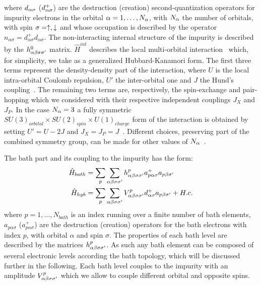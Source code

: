 \documentclass[edipack2.tex]{subfiles}
\begin{document}
where $d_{\alpha\sigma}$ ($d^+_{\alpha\sigma}$) are the destruction (creation)
second-quantization operators for impurity electrons in the
orbital $\alpha=1,\dots,N_\alpha$, with $N_\alpha$ the number of orbitals,
with spin $\sigma=\uparrow,\downarrow$ and whose occupation is described
by the  operator  
$n_{\alpha\sigma}=d^{+}_{\alpha\sigma}d_{\alpha\sigma}$. 
The non-interacting internal structure of the impurity is described by
the $h^{0}_{\alpha\beta\sigma\sigma'}$ matrix. 
$\hat{H}^{int}$ describes the  local multi-orbital
interaction~\cite{Georges2013ACMP} which, for simplicity, we take as a
generalized Hubbard-Kanamori form.  
The first three terms represent the density-density part of the
interaction, where $U$ is the local intra-orbital Coulomb repulsion,
$U'$ the inter-orbital one and $J$ the Hund's coupling~\cite{Georges2013ACMP}.  
The  remaining two terms are, respectively, the spin-exchange and
pair-hopping which we considered with their respective independent
couplings $J_X$ and $J_P$.
In the case $N_\alpha=3$ a fully symmetric $SU(3)_{orbital}\times SU(2)_{spin}\times
U(1)_{charge}$ form of the interaction is obtained by setting $U'=U-2J$ and
$J_X=J_P=J$~\cite{Georges2013ACMP}. Different choices, preserving part
of the combined symmetry group, can be made for other values of
$N_\alpha$~\cite{Georges2013ACMP}. 


The bath part and its coupling to the impurity has the form: 
\begin{equation}\label{Hbath}
  \begin{split}
    \hat{H}_{bath} &=
    \sum_p\sum_{\alpha\beta\sigma\sigma'}h^p_{\alpha\beta\sigma\sigma'}a^{+}_{p\alpha\sigma}a_{p\beta\sigma'}\\
    \hat{H}_{hyb} &= \sum_p\sum_{\alpha\beta\sigma\sigma'}V^p_{\alpha\beta\sigma\sigma'}d^{+}_{\alpha\sigma}a_{p\beta\sigma'}+H.c. \\
\end{split}
\end{equation}
where $p=1,\dots,N_{bath}$ is an index running over a finite number of
bath elements, $a_{p\alpha\sigma}$ ($a^+_{p\alpha\sigma}$) are the destruction (creation) operators for
the bath electrons with index $p$, with orbital $\alpha$ and
spin $\sigma$.
The  properties of each bath level are described by the
matrices $h^p_{\alpha\beta\sigma\sigma'}$. As such any bath element can be
composed of several electronic levels according the bath topology,
which will be discussed further in the following.
Each bath level couples to the impurity with an amplitude
$V^p_{\alpha\beta\sigma\sigma'}$ which we allow to couple different orbital and
opposite spins.   
\end{document}
